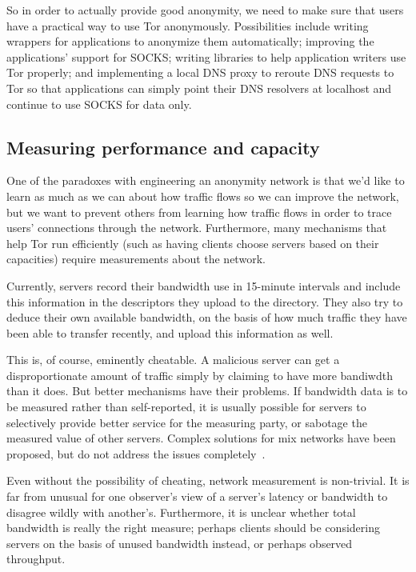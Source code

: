 \documentclass{llncs}
\begin{document}
So in order to actually provide good anonymity, we need to make sure that
users have a practical way to use Tor anonymously.  Possibilities include
writing wrappers for applications to anonymize them automatically; improving
the applications' support for SOCKS; writing libraries to help application
writers use Tor properly; and implementing a local DNS proxy to reroute DNS
requests to Tor so that applications can simply point their DNS resolvers at
localhost and continue to use SOCKS for data only.

\subsection{Measuring performance and capacity}
\label{subsec:performance}

One of the paradoxes with engineering an anonymity network is that we'd like
to learn as much as we can about how traffic flows so we can improve the
network, but we want to prevent others from learning how traffic flows in
order to trace users' connections through the network.  Furthermore, many
mechanisms that help Tor run efficiently (such as having clients choose servers
based on their capacities) require measurements about the network.

Currently, servers record their bandwidth use in 15-minute intervals and
include this information in the descriptors they upload to the directory.
They also try to deduce their own available bandwidth, on the basis of how
much traffic they have been able to transfer recently, and upload this
information as well.

This is, of course, eminently cheatable.  A malicious server can get a
disproportionate amount of traffic simply by claiming to have more bandiwdth
than it does.  But better mechanisms have their problems.  If bandwidth data
is to be measured rather than self-reported, it is usually possible for
servers to selectively provide better service for the measuring party, or
sabotage the measured value of other servers.  Complex solutions for
mix networks have been proposed, but do not address the issues
completely~\cite{mix-acc,casc-rep}.

Even without the possibility of cheating, network measurement is
non-trivial.  It is far from unusual for one observer's view of a server's
latency or bandwidth to disagree wildly with another's.  Furthermore, it is
unclear whether total bandwidth is really the right measure; perhaps clients
should be considering servers on the basis of unused bandwidth instead, or
perhaps observed throughput.
\end{document}
